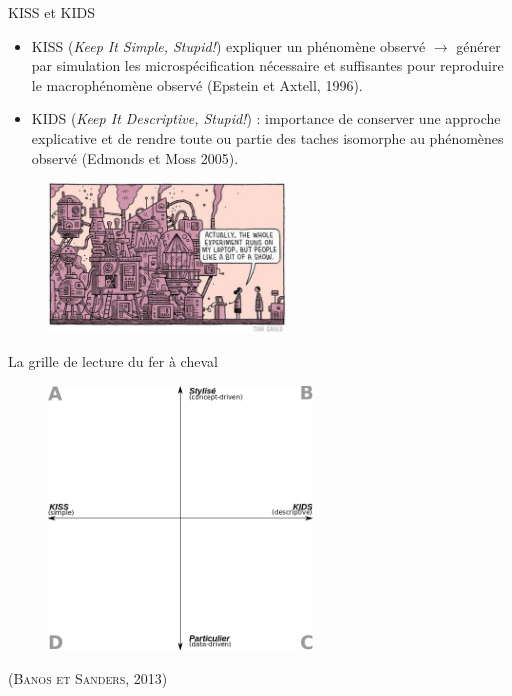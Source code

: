 \documentclass[newPxFont]{beamer}
\begin{document}
\begin{frame}[c]{KISS et KIDS}
  \vspace{-2em}
  \begin{itemize}
    \item KISS (\textit{Keep It Simple, Stupid!}) expliquer un phénomène observé $\rightarrow$ générer par simulation les microspécification nécessaire et suffisantes pour reproduire le macrophénomène observé (Epstein et Axtell, 1996).
    \item KIDS (\textit{Keep It Descriptive, Stupid!}) : importance de conserver une approche explicative et de rendre toute ou partie des taches isomorphe au phénomènes observé (Edmonds et Moss 2005).
  \end{itemize}
  \vspace{-1em}
  \begin{figure}
   \includegraphics[height=4cm]{img/a_KIDS.jpg}
  \end{figure}
\end{frame}

\begin{frame}[c]{La grille de lecture du fer à cheval}
  \vspace{-2em}
  \begin{figure}
   \includegraphics[height=7cm]{img/a_banos_sanders.png}
  \end{figure}
  \hspace*{\fill}\textsc{(Banos et Sanders, 2013)}
\end{frame}
\end{document}
